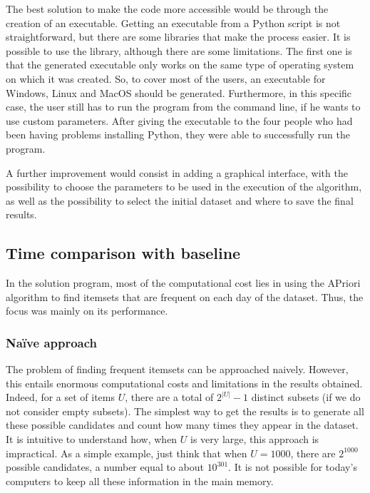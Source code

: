 The best solution to make the code more accessible would be through the creation of an executable. Getting an executable from a  Python script is not straightforward, but there are some libraries that make the process easier. It is possible to use the  library, although there are some limitations. The first one is that the generated executable only works on the same type of operating system on which it was created. So, to cover most of the users, an executable for Windows, Linux and MacOS should be generated. Furthermore, in this specific case, the user still has to run the program from the command line, if he wants to use custom parameters. After giving the executable to the four people who had been having problems installing Python, they were able to successfully run the program.

A further improvement would consist in adding a graphical interface, with the possibility to choose the parameters to be used in the execution of the algorithm, as well as the possibility to select the initial dataset and where to save the final results.

\subsection*{Time comparison with baseline}

In the solution program, most of the computational cost lies in using the APriori algorithm to find itemsets that are frequent on each day of the dataset. Thus, the focus was mainly on its performance.

\subsubsection*{Naïve approach}
The problem of finding frequent itemsets can be approached naively. However, this entails enormous computational costs and limitations in the results obtained. Indeed, for a set of items $U$, there are a total of $2^{|U|}-1$ distinct subsets (if we do not consider empty subsets). The simplest way to get the results is to generate all these possible candidates and count how many times they appear in the dataset. It is intuitive to understand how, when $U$ is very large, this approach is impractical. As a simple example, just think that when $U = 1000$, there are $2^{1000}$ possible candidates, a number equal to about $10^{301}$. It is not possible for today's computers to keep all these information in the main memory.

